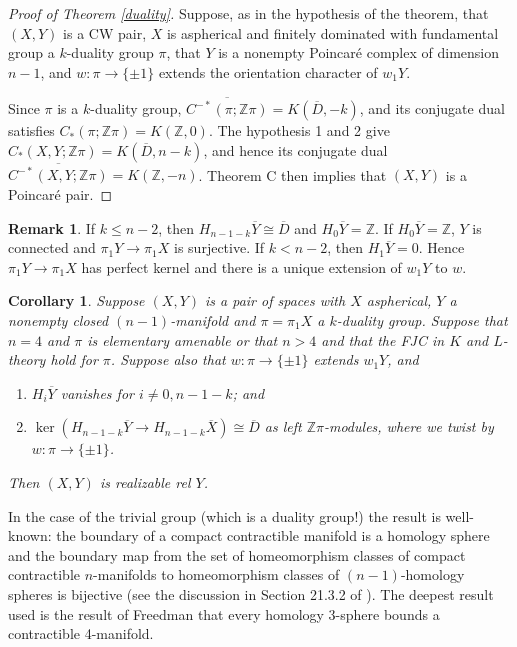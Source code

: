 \documentclass[12pt]{amsart}
\newtheorem{corollary}[theorem]{Corollary}
\theoremstyle{definition}
\newtheorem{remark}[theorem]{Remark}
\newcommand{\Z}{\mathbb Z}
\newcommand{\ol}[1]{{\overline{#1}}}
\begin{document}
\begin{proof}[Proof of Theorem \ref{duality}]
Suppose, as in the hypothesis of the theorem, that $(X,Y)$ is a CW pair, $X$ is aspherical and finitely dominated with fundamental group a $k$-duality group $\pi$,  that $Y$ is a nonempty Poincar\'e complex of dimension $n-1$, and $w : \pi \to \{\pm1\}$ extends the orientation character of $w_1Y$.

Since $\pi$ is a $k$-duality group, $\ol{C^{-*}(\pi;\Z\pi)} = K(\ol D, -k)$, and its conjugate dual satisfies $C_*(\pi;\Z\pi) = K(\Z,0)$.  The hypothesis 1 and 2 give $C_*(X,Y; \Z\pi) = K(\ol D, n-k)$, and hence its conjugate dual $\ol{C^{-*}(X,Y; \Z\pi)} = K(\Z,-n)$.   Theorem C then implies that $(X,Y)$ is a Poincar\'e pair.
\end{proof}

\begin{remark}
If $k \leq  n-2$, then $H_{n-1-k} \ol Y \cong \ol D$ and $H_0\ol Y = \Z$.    If  $H_0\ol Y = \Z$, $Y$ is connected and $\pi_1 Y \to \pi_1 X$ is surjective.   If $k < n-2$, then $H_1\ol Y = 0$.   Hence  $\pi_1 Y \to \pi_1 X$ has perfect kernel and there is a unique extension of $w_1Y$ to $w$.
\end{remark}



\begin{corollary} \label{manifold duality group}
Suppose $(X,Y)$ is a pair of spaces with $X$ aspherical, $Y$ a nonempty closed $(n-1)$-manifold and $\pi = \pi_1X$ a $k$-duality group.  Suppose that $n = 4$ and $\pi$ is elementary amenable or that $n > 4$ and that the FJC in $K$ and $L$-theory hold for $\pi$.   Suppose also that $w: \pi \to \{\pm1\}$ extends $w_1Y$, and 
\begin{enumerate}
 \item $H_i\ol Y $ vanishes for $i \not = 0,n-1-k$; and 
 \item  $\ker (H_{n-1-k} \ol Y  \to H_{n-1-k} \ol X) \cong \ol D$ as left $\Z\pi$-modules, where we twist by $w: \pi \to \{\pm 1\}$.  
\end{enumerate}
Then $(X,Y)$ is realizable rel $Y$.

\end{corollary}






In the case of the trivial group (which is a duality group!) the result is well-known: the boundary of a compact contractible manifold is a homology sphere and the boundary map from the set of homeomorphism classes of compact contractible $n$-manifolds to homeomorphism classes of $(n-1)$-homology spheres is bijective (see the discussion in Section 21.3.2 of \cite{BKKPR}).   The deepest result used is the result of Freedman \cite{Fr} that every homology 3-sphere bounds a contractible 4-manifold.   
\end{document}
